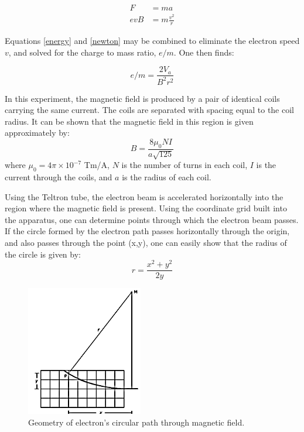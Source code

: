 \begin{align}
\label{newton}
F &= ma \nonumber \\
evB &= m\frac{v^{2}}{r}
\end{align}

Equations \ref{energy} and \ref{newton} may be combined to eliminate the electron speed $v$, and
solved for the charge to mass ratio, $e/m$. One then finds:

\begin{equation}
\label{eom}
\boxed{ e/m = \frac{2V_a}{B^2r^2} }
\end{equation}

In this experiment, the magnetic field is produced by a pair of identical coils
carrying the same current. The coils are separated with spacing equal to the
coil radius. It can be shown that the
magnetic field in this region is given approximately by:
\begin{equation}
\label{helmholtz}
\boxed{ B=\frac{8 \mu_0 N I}{a \sqrt{125}} }
\end{equation}
\noindent where $\mu_0 = 4\pi \times 10^{-7} $ Tm/A, $N$ is the number of turns
in each coil, $I$ is the current through the coils, and $a$ is the radius of
each coil.

Using the Teltron tube, the electron beam is accelerated horizontally into the
region where the magnetic field is present. Using the coordinate grid built into
the apparatus, one can determine points through which the electron beam
passes. If the circle formed by the electron path passes horizontally through
the origin, and also passes through the point (x,y), one can easily show that
the radius of the circle is given by:
\begin{equation}
\label{circle}
\boxed{ r=\frac{x^2+y^2}{2y} }
\end{equation}

\begin{figure}
\begin{center}
\includegraphics[width=2in]{../images/radius.png}
\caption{Geometry of electron's circular path through magnetic field.}
\label{circularpath}
\end{center}
\end{figure}


